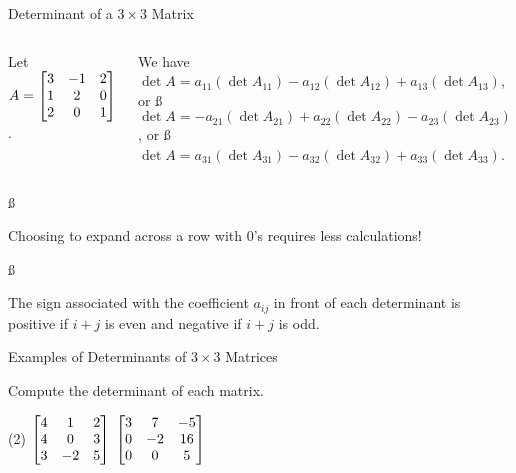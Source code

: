\documentclass[xcolor=dvipsnames,aspectratio=169,t]{beamer}
\begin{document}
\begin{frame}{Determinant of a $3 \times 3$ Matrix}


\begin{columns}[T]

\column{0.3\tw}

Let $\displaystyle A = \begin{bmatrix} 3  & -1 & 2 \\ 1 & 2 & 0 \\ 2 & 0 & 1 \end{bmatrix}$. 

\column{0.7\tw}

We have
\bi
\ii $\det A = a_{11} \left( \det A_{11} \right) - a_{12} \left( \det A_{12} \right) + a_{13} \left( \det A_{13} \right)$, or \ss
\ii $\det A = -a_{21} \left( \det A_{21} \right) + a_{22} \left( \det A_{22} \right) - a_{23} \left( \det A_{23} \right)$, or \ss
\ii $\det A = a_{31} \left( \det A_{31} \right) - a_{32} \left( \det A_{32} \right) + a_{33} \left( \det A_{33} \right)$.
\ei 

\end{columns}

\ss

\bbox
Choosing to expand across a row with $0$'s requires less calculations!
\ebox

\ss

\bbox
The sign associated with the coefficient $a_{ij}$ in front of each determinant is positive if $i+j$ is even and negative if $i+j$ is odd.
\ebox

\end{frame}

\begin{frame}{Examples of Determinants of $3 \times 3$ Matrices}

Compute the determinant of each matrix.

 \begin{tasks}(2)
\task $\displaystyle \begin{bmatrix} 4 & 1 & 2 \\ 4 & 0 & 3 \\ 3 & -2 & 5 \end{bmatrix}$
\task $\displaystyle \begin{bmatrix}  3 & 7 & -5 \\ 0 & -2 & 16 \\ 0 & 0 & 5 \end{bmatrix}$
\end{tasks}

\vspace{3in}
\end{frame}
\end{document}
